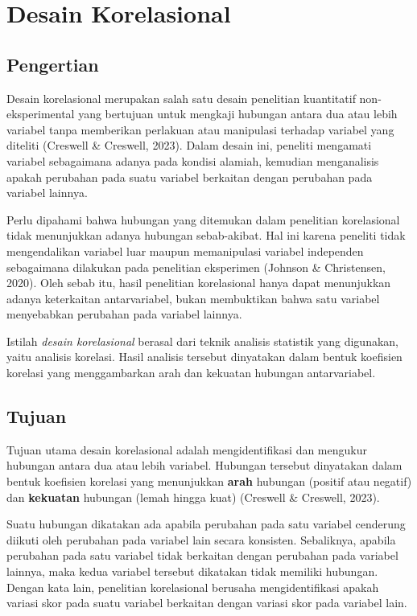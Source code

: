 \documentclass[
  indonesian,
  letterpaper,
  DIV=11,
  numbers=noendperiod]{scrreprt}
\begin{document}
\section{Desain Korelasional}\label{desain-korelasional}

\subsection{Pengertian}\label{pengertian}

Desain korelasional merupakan salah satu desain penelitian kuantitatif
non-eksperimental yang bertujuan untuk mengkaji hubungan antara dua atau
lebih variabel tanpa memberikan perlakuan atau manipulasi terhadap
variabel yang diteliti (Creswell \& Creswell, 2023). Dalam desain ini,
peneliti mengamati variabel sebagaimana adanya pada kondisi alamiah,
kemudian menganalisis apakah perubahan pada suatu variabel berkaitan
dengan perubahan pada variabel lainnya.

Perlu dipahami bahwa hubungan yang ditemukan dalam penelitian
korelasional tidak menunjukkan adanya hubungan sebab-akibat. Hal ini
karena peneliti tidak mengendalikan variabel luar maupun memanipulasi
variabel independen sebagaimana dilakukan pada penelitian eksperimen
(Johnson \& Christensen, 2020). Oleh sebab itu, hasil penelitian
korelasional hanya dapat menunjukkan adanya keterkaitan antarvariabel,
bukan membuktikan bahwa satu variabel menyebabkan perubahan pada
variabel lainnya.

Istilah \emph{desain korelasional} berasal dari teknik analisis
statistik yang digunakan, yaitu analisis korelasi. Hasil analisis
tersebut dinyatakan dalam bentuk koefisien korelasi yang menggambarkan
arah dan kekuatan hubungan antarvariabel.

\subsection{Tujuan}\label{tujuan}

Tujuan utama desain korelasional adalah mengidentifikasi dan mengukur
hubungan antara dua atau lebih variabel. Hubungan tersebut dinyatakan
dalam bentuk koefisien korelasi yang menunjukkan \textbf{arah} hubungan
(positif atau negatif) dan \textbf{kekuatan} hubungan (lemah hingga
kuat) (Creswell \& Creswell, 2023).

Suatu hubungan dikatakan ada apabila perubahan pada satu variabel
cenderung diikuti oleh perubahan pada variabel lain secara konsisten.
Sebaliknya, apabila perubahan pada satu variabel tidak berkaitan dengan
perubahan pada variabel lainnya, maka kedua variabel tersebut dikatakan
tidak memiliki hubungan. Dengan kata lain, penelitian korelasional
berusaha mengidentifikasi apakah variasi skor pada suatu variabel
berkaitan dengan variasi skor pada variabel lain.
\end{document}
